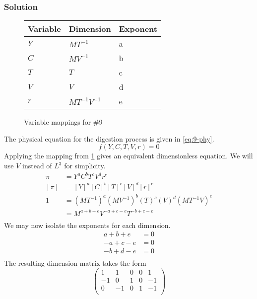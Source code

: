 \documentclass[12pt,twoside]{article}
\begin{document}
  \subsubsection*{Solution}
  \begin{figure}
    \centering
    \begin{tabularx}{0.5\textwidth}{XXX}
      Variable & Dimension & Exponent \\ \midrule
      $Y$ & $MT^{-1}$ & a \\
      $C$ & $MV^{-1}$ & b \\
      $T$ & $T$ & c \\
      $V$ & $V$ & d \\
      $r$ & $MT^{-1}V^{-1}$ & e \\
    \end{tabularx}
    \caption{Variable mappings for \#9}
\label{fig:9-var-mappings}
  \end{figure}
  The physical equation for the digestion process is given in \cref{eq:9-phy}.
  \begin{equation}
    \label{eq:9-phy}
    f(Y,C,T,V,r)=0
  \end{equation}
  Applying the mapping from \cref{fig:9-var-mappings} gives an equivalent
  dimensionless equation. We will use $V$ instead of $L^3$ for simplicity.
  \begin{equation*}
    \begin{aligned}
      \pi &= {Y}^a {C}^b {T}^c {V}^d {r}^e \\
      [\pi] &= {[Y]}^a {[C]}^b {[T]}^c {[V]}^d {[r]}^e \\
      1 &= {(MT^{-1})}^a {(MV^{-1})}^b {(T)}^c {(V)}^d {(MT^{-1}V)}^e \\
      &= M^{a+b+e}V^{-a+c-e}T^{-b+c-e} \\
    \end{aligned}
  \end{equation*}
  We may now isolate the exponents for each dimension.
  \begin{equation*}
    \begin{aligned}
      a + b + e &= 0 \\
      -a + c - e &= 0 \\
      -b + d - e &= 0 \\
    \end{aligned}
  \end{equation*}
  The resulting dimension matrix takes the form
  \begin{equation*}
    \begin{pmatrix}
      1 & 1 & 0 & 0 & 1 \\
      -1 & 0 & 1 & 0 & -1 \\
      0 & -1 & 0 & 1 & -1 \\
    \end{pmatrix}
  \end{equation*}
\end{document}

